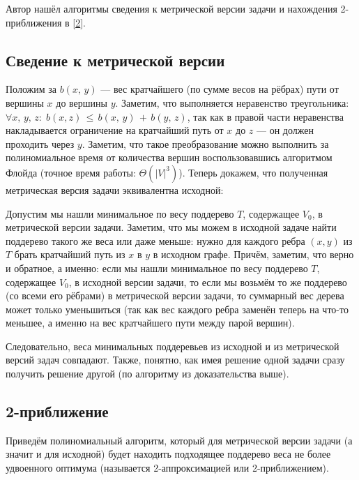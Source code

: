 \documentclass[a4paper,12pt]{article}
\begin{document}
    Автор нашёл алгоритмы сведения к метрической версии задачи и нахождения 2-приближения в [\href{https://www.youtube.com/watch?v=ZQbq3MAiy6Y}{2}].
    
    \subsection{Сведение к метрической версии}

    Положим за $b(x, \, y)$ — вес кратчайшего (по сумме весов на рёбрах) пути от вершины $x$ до вершины $y$. Заметим, что выполняется неравенство треугольника: $\forall x, \, y, \, z: \; b(x, z) \, \leqslant \, b(x, \, y) \, + \, b(y, \, z)$, так как в правой части неравенства накладывается ограничение на кратчайший путь от $x$ до $z$ — он должен проходить через $y$. Заметим, что такое преобразование можно выполнить за полиномиальное время от количества вершин воспользовавшись алгоритмом Флойда (точное время работы: $\Theta(|V|^3)$). Теперь докажем, что полученная метрическая версия задачи эквивалентна исходной:

    \vspace{1em}

    \noindent Допустим мы нашли минимальное по весу поддерево $T$, содержащее $V_0$, в метрической версии задачи. Заметим, что мы можем в исходной задаче найти поддерево такого же веса или даже меньше: нужно для каждого ребра $(x, y)$ из $T$ брать кратчайший путь из $x$ в $y$ в исходном графе. Причём, заметим, что верно и обратное, а именно: если мы нашли минимальное по весу поддерево $T$, содержащее $V_0$, в исходной версии задачи, то если мы возьмём то же поддерево (со всеми его рёбрами) в метрической версии задачи, то суммарный вес дерева может только уменьшиться (так как вес каждого ребра заменён теперь на что-то меньшее, а именно на вес кратчайшего пути между парой вершин).

    \vspace{1em}

    \noindent Следовательно, веса минимальных поддеревьев из исходной и из метрической версий задач совпадают. Также, понятно, как имея решение одной задачи сразу получить решение другой (по алгоритму из доказательства выше).
    
    \subsection{2-приближение}

    Приведём полиномиальный алгоритм, который для метрической версии задачи (а значит и для исходной) будет находить подходящее поддерево веса не более удвоенного оптимума (называется 2-аппроксимацией или 2-приближением).
\end{document}
